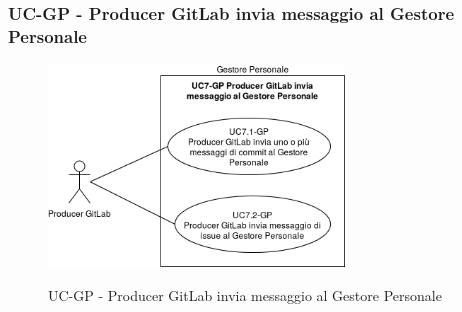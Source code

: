 \subsubsection{UC\theuccount-GP - Producer GitLab invia messaggio al Gestore Personale}
	\begin{figure}[H]
		\centering
		\includegraphics[width=0.7\textwidth]{img/casi_d'uso/UC7.png}\\
		\caption{UC\theuccount-GP - Producer GitLab invia messaggio al Gestore Personale}
	\end{figure}
